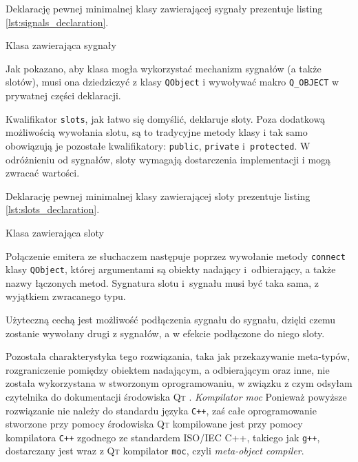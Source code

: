 Deklarację pewnej minimalnej klasy zawierającej sygnały prezentuje listing \ref{lst:signals_declaration}.

\begin{listing}
  
  \caption{Klasa zawierająca sygnały}
  \label{lst:signals_declaration}
\end{listing}

Jak pokazano, aby klasa mogła wykorzystać mechanizm sygnałów (a także slotów), musi ona dziedziczyć z klasy \verb|QObject| i wywoływać makro \verb|Q_OBJECT| w prywatnej części deklaracji.

Kwalifikator \verb|slots|, jak łatwo się domyślić, deklaruje sloty.
Poza dodatkową możliwością wywołania slotu, są to tradycyjne metody klasy i tak samo obowiązują je pozostałe kwalifikatory: \verb|public|, \verb|private| i~\verb|protected|.
W odróżnieniu od sygnałów, sloty wymagają dostarczenia implementacji i mogą zwracać wartości.

Deklarację pewnej minimalnej klasy zawierającej sloty prezentuje listing \ref{lst:slots_declaration}.

\begin{listing}
  
  \caption{Klasa zawierająca sloty}
  \label{lst:slots_declaration}
\end{listing}

Połączenie emitera ze słuchaczem następuje poprzez wywołanie metody \verb|connect| klasy \verb|QObject|, której argumentami są obiekty nadający i~odbierający, a także nazwy łączonych metod.
Sygnatura slotu i~sygnału musi być taka sama, z wyjątkiem zwracanego typu.

Użyteczną cechą jest możliwość podłączenia sygnału do sygnału, dzięki czemu zostanie wywołany drugi z sygnałów, a w efekcie podłączone do niego sloty.

Pozostała charakterystyka tego rozwiązania, taka jak przekazywanie meta-typów, rozgraniczenie pomiędzy obiektem nadającym, a odbierającym oraz inne, nie została wykorzystana w stworzonym oprogramowaniu, w związku z czym odsyłam czytelnika do dokumentacji środowiska \textsc{Qt} \citep{Qt}.
\newline
\newline
\textsl{Kompilator moc} Ponieważ powyższe rozwiązanie nie należy do standardu języka \verb|C++|, zaś całe oprogramowanie stworzone przy pomocy środowiska \textsc{Qt} kompilowane jest przy pomocy kompilatora \verb|C++| zgodnego ze standardem ISO/IEC C++\citep{CPPStandard}, takiego jak \texttt{g++}, dostarczany jest wraz z \textsc{Qt} kompilator \texttt{moc}, czyli \textsl{meta-object compiler}.

